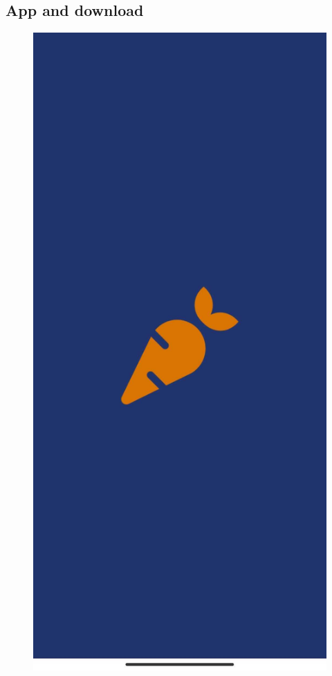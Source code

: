 \documentclass{article}
\begin{document}
\subsection{App and download}
\begin{figure}[h!]
    \centering
    \includegraphics[scale=0.066]{Images/flashcreen.jpg}

\end{figure}
\end{document}
